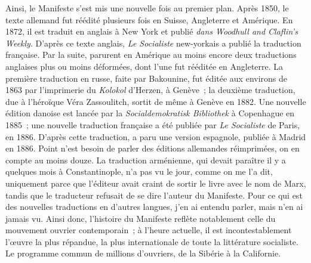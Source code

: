 \documentclass[french,twoside]{book} %
\begin{document}
Ainsi, le Manifeste s’est mis une nouvelle fois au premier plan. Après 1850, le texte allemand fut réédité plusieurs fois en Suisse, Angleterre et Amérique. En 1872, il est traduit en anglais à New York et publié \emph{dans Woodhull and Claflin’s Weekly}. D'après ce texte anglais, \emph{Le Socialiste} new-yorkais a publié la traduction française. Par la suite, parurent en Amérique au moins encore deux traductions anglaises plus ou moins déformées, dont l’une fut rééditée en Angleterre. La première traduction en russe, faite par Bakounine, fut éditée aux environs de 1863 par l’imprimerie du \emph{Kolokol} d’Herzen, à Genève ; la deuxième traduction, due à l’héroïque Véra Zassoulitch, sortit de même à Genève en 1882. Une nouvelle édition danoise est lancée par la \emph{Socialdemokratisk Bibliothek} à Copenhague en 1885 ; une nouvelle traduction française a été publiée par\emph{ Le Socialiste} de Paris, en 1886. D'après cette traduction, a paru une version espagnole, publiée à Madrid en 1886. Point n’est besoin de parler des éditions allemandes réimprimées, on en compte au moins douze. La traduction arménienne, qui devait paraître il y a quelques mois à Constantinople, n’a pas vu le jour, comme on me l’a dit, uniquement parce que l’éditeur avait craint de sortir le livre avec le nom de Marx, tandis que le traducteur refusait de se dire l’auteur du Manifeste. Pour ce qui est des nouvelles traductions en d’autres langues, j’en ai entendu parler, mais n’en ai jamais vu. Ainsi donc, l’histoire du Manifeste reflète notablement celle du mouvement ouvrier contemporain ; à l’heure actuelle, il est incontestablement l’œuvre la plus répandue, la plus internationale de toute la littérature socialiste. Le programme commun de millions d’ouvriers, de la Sibérie à la Californie.\par
\end{document}
